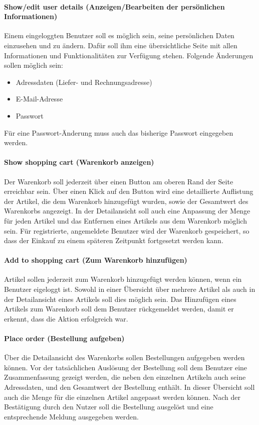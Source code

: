 \paragraph{Show/edit user details (Anzeigen/Bearbeiten der persönlichen Informationen)}$\;$ \\
Einem eingeloggten Benutzer soll es möglich sein, seine persönlichen Daten einzusehen und zu ändern.
Dafür soll ihm eine übersichtliche Seite mit allen Informationen und Funktionalitäten zur Verfügung stehen.
Folgende Änderungen sollen möglich sein:
\begin{itemize}
\item Adressdaten (Liefer- und Rechnungsadresse)
\item E-Mail-Adresse
\item Passwort
\end{itemize}
Für eine Passwort-Änderung muss auch das bisherige Passwort eingegeben werden.

\paragraph{Show shopping cart (Warenkorb anzeigen)}$\;$ \\
Der Warenkorb soll jederzeit über einen Button am oberen Rand der Seite erreichbar sein.
Über einen Klick auf den Button wird eine detaillierte Auflistung der Artikel, die dem Warenkorb hinzugefügt wurden, sowie der Gesamtwert des Warenkorbs angezeigt.
In der Detailansicht soll auch eine Anpassung der Menge für jeden Artikel und das Entfernen eines Artikels aus dem Warenkorb möglich sein.
Für registrierte, angemeldete Benutzer wird der Warenkorb gespeichert, so dass der Einkauf zu einem späteren Zeitpunkt fortgesetzt werden kann.
\paragraph{Add to shopping cart (Zum Warenkorb hinzufügen)}$\;$ \\
Artikel sollen jederzeit zum Warenkorb hinzugefügt werden können, wenn ein Benutzer eigeloggt ist. Sowohl in einer Übersicht über mehrere Artikel als auch in der Detailansicht eines Artikels soll dies möglich sein.
Das Hinzufügen eines Artikels zum Warenkorb soll dem Benutzer rückgemeldet werden, damit er erkennt, dass die Aktion erfolgreich war.
\paragraph{Place order (Bestellung aufgeben)}$\;$ \\
Über die Detailansicht des Warenkorbs sollen Bestellungen aufgegeben werden können.
Vor der tatsächlichen Auslösung der Bestellung soll dem Benutzer eine Zusammenfassung gezeigt werden, die neben den einzelnen Artikeln auch seine Adressdaten, und den Gesamtwert der Bestellung enthält.
In dieser Übersicht soll auch die Menge für die einzelnen Artikel angepasst werden können.
Nach der Bestätigung durch den Nutzer soll die Bestellung ausgelöst und eine entsprechende Meldung ausgegeben werden.
